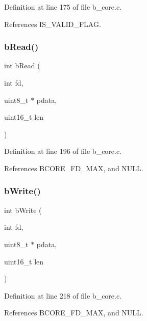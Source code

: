 Definition at line 175 of file b\+\_\+core.\+c.



References I\+S\+\_\+\+V\+A\+L\+I\+D\+\_\+\+F\+L\+AG.

\mbox{\label{group___c_o_r_e___exported___functions_ga19ddb6f8ca523b3b28b74ea6a1519e3b}} 
\subsubsection{\texorpdfstring{b\+Read()}{bRead()}}
{\footnotesize\ttfamily int b\+Read (\begin{DoxyParamCaption}\item[{int}]{fd,  }\item[{uint8\+\_\+t $\ast$}]{pdata,  }\item[{uint16\+\_\+t}]{len }\end{DoxyParamCaption})}



Definition at line 196 of file b\+\_\+core.\+c.



References B\+C\+O\+R\+E\+\_\+\+F\+D\+\_\+\+M\+AX, and N\+U\+LL.

\mbox{\label{group___c_o_r_e___exported___functions_ga078b200cdc68be6d562cc1ad323d9381}} 
\subsubsection{\texorpdfstring{b\+Write()}{bWrite()}}
{\footnotesize\ttfamily int b\+Write (\begin{DoxyParamCaption}\item[{int}]{fd,  }\item[{uint8\+\_\+t $\ast$}]{pdata,  }\item[{uint16\+\_\+t}]{len }\end{DoxyParamCaption})}



Definition at line 218 of file b\+\_\+core.\+c.



References B\+C\+O\+R\+E\+\_\+\+F\+D\+\_\+\+M\+AX, and N\+U\+LL.

